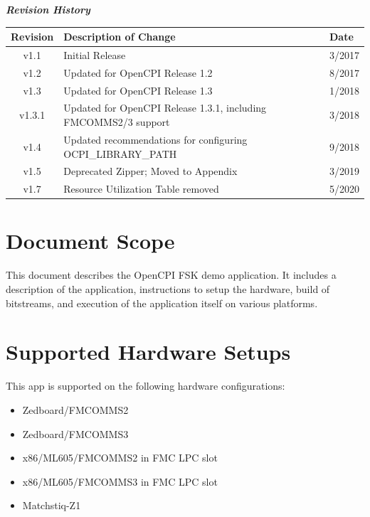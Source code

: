 \maketitle
\newpage
	\begin{center}
	\textit{\textbf{Revision History}}
		\begin{table}[H]
		\label{table:revisions} %
			\begin{tabularx}{\textwidth}{|c|X|l|}
			\hline
			\rowcolor{blue}
			\textbf{Revision} & \textbf{Description of Change} & \textbf{Date} \\
		    \hline
		    v1.1 & Initial Release & 3/2017 \\
		    \hline
		    v1.2 & Updated for OpenCPI Release 1.2 & 8/2017 \\
			\hline
			v1.3 & Updated for OpenCPI Release 1.3 & 1/2018 \\
			\hline
			v1.3.1 & Updated for OpenCPI Release 1.3.1, including FMCOMMS2/3 support & 3/2018 \\
			\hline
			v1.4 & Updated recommendations for configuring OCPI\_LIBRARY\_PATH & 9/2018 \\
			\hline
			v1.5 & Deprecated Zipper; Moved to Appendix & 3/2019 \\
			\hline
			v1.7 & Resource Utilization Table removed & 5/2020 \\
			\hline
			\end{tabularx}
		\end{table}
	\end{center}

\newpage
\tableofcontents
\pagebreak
\section{Document Scope}
This document describes the OpenCPI FSK demo application. It includes a description of the application, instructions to setup the hardware, build of bitstreams, and execution of the application itself on various platforms.

\section{Supported Hardware Setups}
This app is supported on the following hardware configurations:
\begin{itemize}
  \item Zedboard/FMCOMMS2
  \item Zedboard/FMCOMMS3
  \item x86/ML605/FMCOMMS2 in FMC LPC slot
  \item x86/ML605/FMCOMMS3 in FMC LPC slot
  \item Matchstiq-Z1
\end{itemize}

